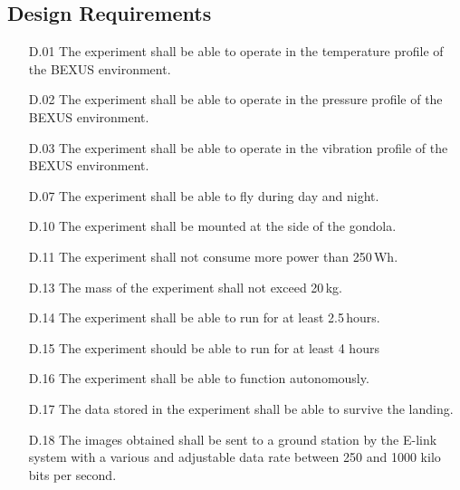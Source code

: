 \subsection{Design Requirements}

\begin{enumerate}[topsep=0pt,itemsep=-1ex,partopsep=1ex,parsep=1ex]
	\item[D.01] The experiment shall be able to operate in the temperature profile of the BEXUS environment.
	\item[D.02] The experiment shall be able to operate in the pressure profile of the BEXUS environment.
    \item[D.03] The experiment shall be able to operate in the vibration profile of the BEXUS environment.
	\item[D.07] The experiment shall be able to fly during day and night.
	\item[D.10] The experiment shall be mounted at the side of the gondola.
	\item[D.11] The experiment shall not consume more power than 250\,Wh.
    \item[D.13] The mass of the experiment shall not exceed 20\,kg.
    \item[D.14] The experiment shall be able to run for at least 2.5\,hours.
    \item[D.15] The experiment should be able to run for at least 4 hours
    \item[D.16] The experiment shall be able to function autonomously.
    \item[D.17] The data stored in the experiment shall be able to survive the landing.
    \item[D.18] The images obtained shall be sent to a ground station by the E-link system with a various and adjustable data rate between 250 and 1000 kilo bits per second.
\end{enumerate}
